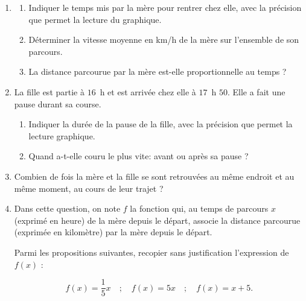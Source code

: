 \documentclass[exercice,a4]{thedocument}%
\begin{document}
\begin{enumerate}
\item
	\begin{enumerate}
		\item Indiquer le temps mis par la mère pour rentrer chez elle, avec la précision que permet la lecture du graphique.
		\item Déterminer la vitesse moyenne en km/h de la mère sur l'ensemble de son parcours.
		\item La distance parcourue par la mère est-elle proportionnelle au temps ?
	\end{enumerate}
\item La fille est partie à $16$~h et est arrivée chez elle à $17$~h $50$. Elle a fait une pause durant sa course.
	\begin{enumerate}
		\item Indiquer la durée de la pause de la fille, avec la précision que permet la lecture graphique.
		\item Quand a-t-elle couru le plus vite: avant ou après sa pause ?
	\end{enumerate}
\item Combien de fois la mère et la fille se sont retrouvées au même endroit et au même moment, au cours de leur trajet ?
\item Dans cette question, on note $f$ la fonction qui, au temps de parcours $x$ (exprimé en heure) de la mère depuis le départ, associe la distance parcourue (exprimée en kilomètre) par la mère depuis le départ.

Parmi les propositions suivantes, recopier sans justification l'expression de $f(x)$ :

\[f(x) = \dfrac{1}{5}x \quad;\quad  f(x) = 5x \quad;\quad  f(x) = x + 5.\]

\end{enumerate}

\bigskip

\showthesource
\end{document}
